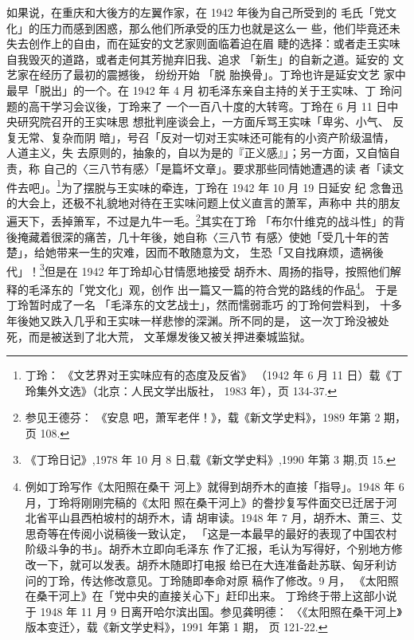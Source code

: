如果说，在重庆和大後方的左翼作家，在 1942 年後为自己所受到的 毛氏「党文
化」的压力而感到困惑，那么他们所承受的压力也就是这么一 些，他们毕竟还未
失去创作上的自由，而在延安的文艺家则面临着迫在眉 睫的选择：或者走王实味
自我毁灭的道路，或者走何其芳抛弃旧我、追求 「新生」的自新之道。延安的
文艺家在经历了最初的震撼後， 纷纷开始 「脱 胎换骨」。丁玲也许是延安文艺
家中最早「脱出」的一个。在 1942 年 4 月 初毛泽东亲自主持的关于王实味、丁
玲问题的高干学习会议後，丁玲来了 一个一百八十度的大转弯。丁玲在 6 月 11
日中央研究院召开的王实味思 想批判座谈会上，一方面斥骂王实味「卑劣、小气、
反复无常、复杂而阴 暗」，号召「反对一切对王实味还可能有的小资产阶级温情，
人道主义，失 去原则的，抽象的，自以为是的『正义感』」；另一方面，又自恼自
责，称 自己的〈三八节有感〉「是篇坏文章」。要求那些同情她遭遇的读
者「读文 件去吧」。\footnote{丁玲： 《文艺界对王实味应有的态度及反省》
（1942 年 6 月 11 日）载《丁玲集外文选》（北京：人民文学出版社， 1983
年），页 134-37.}为了摆脱与王实味的牵连，丁玲在 1942 年 10 月 19 日延安
纪 念鲁迅的大会上，还极不礼貌地对待在王实味问题上仗义直言的萧军，声称中
共的朋友遍天下，丢掉箫军，不过是九牛一毛。\footnote{参见王德芬： 《安息
吧，萧军老伴！》，载《新文学史料》，1989 年第 2 期，页 108.}其实在丁玲
「布尔什维克的战斗性」的背後掩藏着很深的痛苦，几十年後，她自称〈三八节
有感〉使她「受几十年的苦楚」，给她带来一生的灾难，因而不敢随意为文，
生恐「又自找麻烦，遗祸後代」！\footnote{《丁玲日记》,1978 年 10 月 8 日,载《新文学史料》,1990 年第 3
期,页 15.  }但是在 1942 年丁玲却心甘情愿地接受
胡乔木、周扬的指导，按照他们解释的毛泽东的「党文化」观，创作
出一篇又一篇的符合党的路线的作品\footnote{例如丁玲写作《太阳照在桑干
河上》就得到胡乔木的直接「指导」。1948 年 6 月，丁玲将刚刚完稿的《太阳
照在桑干河上》的誊抄复写件面交已迁居于河北省平山县西柏坡村的胡乔木，请
胡审读。1948 年 7 月，胡乔木、萧三、艾思奇等在传阅小说稿後一致认定，
「这是一本最早的最好的表现了中国农村阶级斗争的书」。胡乔木立即向毛泽东
作了汇报，毛认为写得好，个别地方修改一下，就可以发表。胡乔木随即打电报
给已在大连准备赴苏联、匈牙利访问的丁玲，传达修改意见。丁玲随即奉命对原
稿作了修改。9 月， 《太阳照在桑干河上》在「党中央的直接关心下」赶印出来。
丁玲终于带上这部小说于 1948 年 11 月 9 日离开哈尔滨出国。参见龚明德：
〈《太阳照在桑干河上》版本变迁〉，载《新文学史料》，1991 年第 1 期，
页 121-22. }。 于是丁玲暂时成了一名 「毛泽东的文艺战士」，然而懦弱乖巧
的丁玲何尝料到， 十多年後她又跌入几乎和王实味一样悲惨的深渊。所不同的是，
这一次丁玲没被处死，而是被送到了北大荒， 文革爆发後又被关押进秦城监狱。
